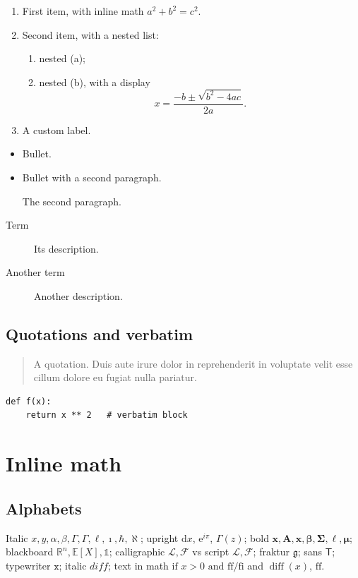 \documentclass[11pt,letterpaper]{article}
\theoremstyle{definition}
\theoremstyle{remark}
\newcommand{\E}{\mathbb{E}}
\begin{document}
\begin{enumerate}
    \item First item, with inline math $a^2 + b^2 = c^2$.
    \item Second item, with a nested list:
    \begin{enumerate}
        \item nested (a);
        \item nested (b), with a display
        \[ x = \frac{-b \pm \sqrt{b^2 - 4ac}}{2a}. \]
    \end{enumerate}
    \item[$\star$] A custom label.
\end{enumerate}
\begin{itemize}
    \item Bullet.
    \item Bullet with a second paragraph.

    The second paragraph.
\end{itemize}
\begin{description}
    \item[Term] Its description.
    \item[Another term] Another description.
\end{description}

\subsection{Quotations and verbatim}

\begin{quote}
    A quotation. Duis aute irure dolor in reprehenderit in voluptate velit esse cillum dolore eu fugiat nulla pariatur.
\end{quote}
\begin{verbatim}
def f(x):
    return x ** 2   # verbatim block
\end{verbatim}


\section{Inline math}

\subsection{Alphabets}

Italic $x, y, \alpha, \beta, \Gamma, \varGamma, \ell, \imath, \hbar, \aleph$;
upright $\mathrm{d}x$, $\mathrm{e}^{i\pi}$, $\Gamma(z)$;
bold $\mathbf{x}, \mathbf{A}, \bm{x}, \bm{\beta}, \bm{\Sigma}, \bm{\ell}, \boldsymbol{\mu}$;
blackboard $\mathbb{R}^n, \E[X], \mathbb{1}$;
calligraphic $\mathcal{L}, \mathcal{F}$ vs script $\mathscr{L}, \mathscr{F}$;
fraktur $\mathfrak{g}$; sans $\mathsf{T}$; typewriter $\mathtt{x}$; italic $\mathit{diff}$;
text in math $\text{if } x > 0 \text{ and ff/fi}$ and $\operatorname{diff}(x)$, $\mathrm{ff}$.
\end{document}
